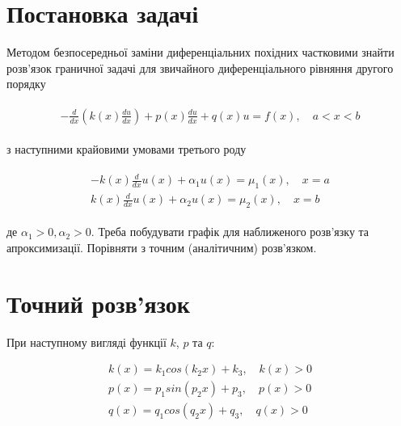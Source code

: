 \section{Постановка задачі}

Методом безпосередньої заміни диференціальних похідних частковими знайти розв’язок граничної задачі для звичайного диференціального рівняння другого порядку

\begin{align} \label{global:problem}  
\begin{split}
-\frac{d}{dx} \left( k(x)\frac{du}{dx} \right) + p(x)\frac{du}{dx} + q(x)u = f(x), \quad a < x < b
\end{split}					
\end{align}

з наступними крайовими умовами третього роду

\begin{align} \label{global:conditions}  
\begin{split}
-k(x)\frac{d}{dx}u(x) + \alpha_1 u(x) = \mu_1(x), \quad x = a \\
k(x)\frac{d}{dx}u(x) + \alpha_2 u(x) = \mu_2(x), \quad x = b
\end{split}					
\end{align}

де $\alpha_1 > 0, \alpha_2 > 0$. Треба побудувати графік для наближеного розв'язку та апроксимизації. Порівняти з точним (аналітичним) розв'язком.



\section{Точний розв'язок}

При наступному вигляді функції $k$, $p$ та $q$:

\begin{equation} \label{anal:coefficients}  
\begin{split}
k(x) = k_1 cos(k_2 x) + k_3, \quad k(x) > 0 \\
p(x) = p_1 sin(p_2 x) + p_3, \quad p(x) > 0 \\
q(x) = q_1 cos(q_2 x) + q_3, \quad q(x) > 0 \\
\end{split}					
\end{equation}

